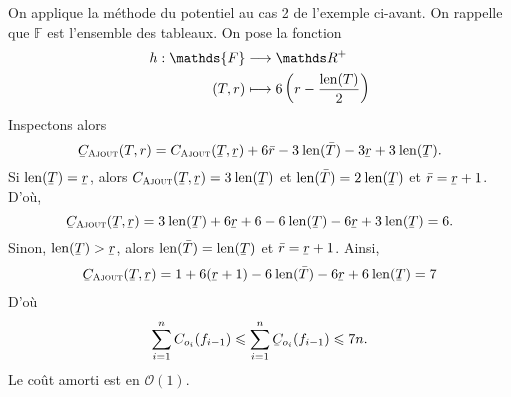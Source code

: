 \documentclass[a4paper]{article}
\begin{document}
	\begin{exm}
		On applique la méthode du potentiel au cas 2 de l'exemple ci-avant.
		On rappelle que $\mathds{F}$\/ est l'ensemble des tableaux. On pose la fonction \begin{align*}
			h: \mathds{F} &\longrightarrow \R^+ \\
			(T, r) &\longmapsto 6\left(r - \frac{\mathrm{len}(T)}{2}\right)
		\end{align*}
		Inspectons alors \[
			\ubar{C}_\textsc{Ajout}(T, r) = C_\textsc{Ajout}(\ubar{T}, \ubar{r}) + 6\bar{r} - 3\:\mathrm{len}(\bar{T}) - 3\ubar{r} + 3\:\mathrm{len}(\ubar{T})
		.\]
		Si $\mathrm{len}(\ubar{T}) = \ubar{r}$, alors $C_\textsc{Ajout}(\ubar{T}, \ubar{r}) = 3\:\mathrm{len}(\ubar{T})$\/ et $\mathrm{len}(\bar{T}) = 2\: \mathrm{len}(\ubar{T})$\/ et $\bar{r} = \ubar{r} + 1$.
		D'où, \[
			\ubar{C}_\textsc{Ajout}(\ubar{T}, \ubar{r}) = 3\:\mathrm{len}(\ubar{T}) + 6\ubar{r} + 6 - 6\:\mathrm{len}(\ubar{T}) - 6\ubar{r} + 3\:\mathrm{len}(\ubar{T}) = 6
		.\] 
		Sinon, $\mathrm{len}(\ubar{T}) > \ubar{r}$, alors $\mathrm{len}(\bar{T}) = \mathrm{len}(\ubar{T})$\/ et $\bar{r} = \ubar{r} + 1$.
		Ainsi,
		\begin{align*}
			\ubar{C}_\textsc{Ajout}(\ubar{T}, \ubar{r}) = 1 + 6 (\ubar{r} + 1) - 6\:\mathrm{len}(\bar{T}) - 6 \ubar{r} + 6\:\mathrm{len}(\ubar{T}) = 7
		\end{align*}
		D'où \[
			\sum_{i=1}^n C_{o_i}(f_{i-1}) \le \sum_{i=1}^n \ubar{C}_{o_i}(f_{i-1}) \le 7n
		.\] Le coût amorti est en $\mathcal{O}(1)$.
	\end{exm}
\end{document}
